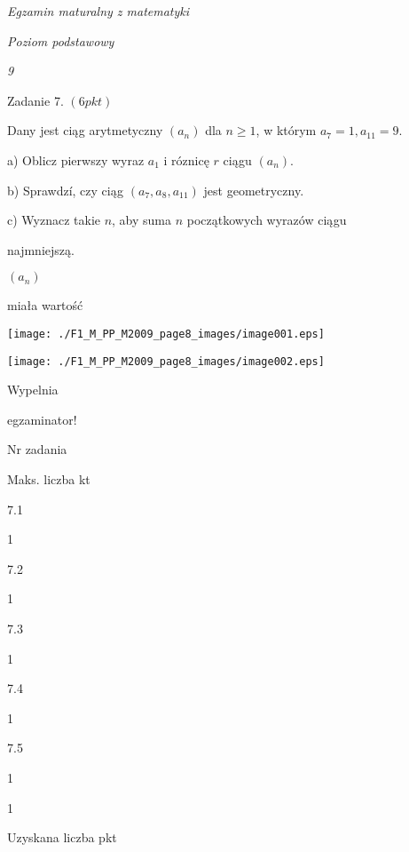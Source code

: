 \documentclass[a4paper,12pt]{article}
\begin{document}
{\it Egzamin maturalny z matematyki}

{\it Poziom podstawowy}

{\it 9}

Zadanie 7. $(6pkt)$

Dany jest ciąg arytmetyczny $(a_{n})$ dla $n\geq 1$, w którym $a_{7}=1, a_{11}=9.$

a) Oblicz pierwszy wyraz $a_{1}$ i róznicę $r$ ciągu $(a_{n}).$

b) Sprawdzí, czy ciąg $(a_{7},a_{8},a_{11})$ jest geometryczny.

c) Wyznacz takie $n$, aby suma $n$ początkowych wyrazów ciągu

najmniejszą.

$(a_{n})$

miała wartość
\begin{center}
\texttt{[image: ./F1\_M\_PP\_M2009\_page8\_images/image001.eps]}

\texttt{[image: ./F1\_M\_PP\_M2009\_page8\_images/image002.eps]}
\end{center}
Wypelnia

egzaminator!

Nr zadania

Maks. liczba kt

7.1

1

7.2

1

7.3

1

7.4

1

7.5

1

1

Uzyskana liczba pkt
\end{document}
